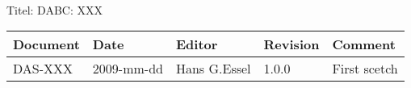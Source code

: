 \\Titel: DABC: XXX
\begin{table}[h]
\begin{tabular}{|p{2.0cm}|p{1.9cm}|p{3.2cm}|p{1.5cm}|p{5.8cm}|} \hline
Document   & Date        & Editor       & Revision & Comment \\
\hline DAS-XXX & 2009-mm-dd & Hans G.Essel & 1.0.0      &
First scetch \\ \hline
\end{tabular}
\end{table}
